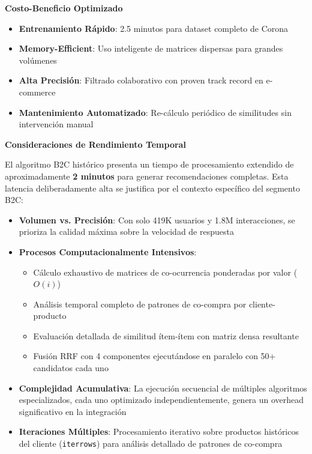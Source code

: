 \documentclass[twocolumn]{article}
\begin{document}
\textbf{Costo-Beneficio Optimizado}
\begin{itemize}
    \item \textbf{Entrenamiento Rápido}: 2.5 minutos para dataset completo de Corona
    \item \textbf{Memory-Efficient}: Uso inteligente de matrices dispersas para grandes volúmenes
    \item \textbf{Alta Precisión}: Filtrado colaborativo con proven track record en e-commerce
    \item \textbf{Mantenimiento Automatizado}: Re-cálculo periódico de similitudes sin intervención manual
\end{itemize}

\textbf{Consideraciones de Rendimiento Temporal}

El algoritmo B2C histórico presenta un tiempo de procesamiento extendido de aproximadamente \textbf{2 minutos} para generar recomendaciones completas. Esta latencia deliberadamente alta se justifica por el contexto específico del segmento B2C:

\begin{itemize}
    \item \textbf{Volumen vs. Precisión}: Con solo 419K usuarios y 1.8M interacciones, se prioriza la calidad máxima sobre la velocidad de respuesta
    \item \textbf{Procesos Computacionalmente Intensivos}: 
    \begin{itemize}
        \item Cálculo exhaustivo de matrices de co-ocurrencia ponderadas por valor (\(O(i)\))
        \item Análisis temporal completo de patrones de co-compra por cliente-producto
        \item Evaluación detallada de similitud ítem-ítem con matriz densa resultante
        \item Fusión RRF con 4 componentes ejecutándose en paralelo con 50+ candidatos cada uno
    \end{itemize}
    \item \textbf{Complejidad Acumulativa}: La ejecución secuencial de múltiples algoritmos especializados, cada uno optimizado independientemente, genera un overhead significativo en la integración
    \item \textbf{Iteraciones Múltiples}: Procesamiento iterativo sobre productos históricos del cliente (\texttt{iterrows}) para análisis detallado de patrones de co-compra
\end{itemize}
\end{document}

